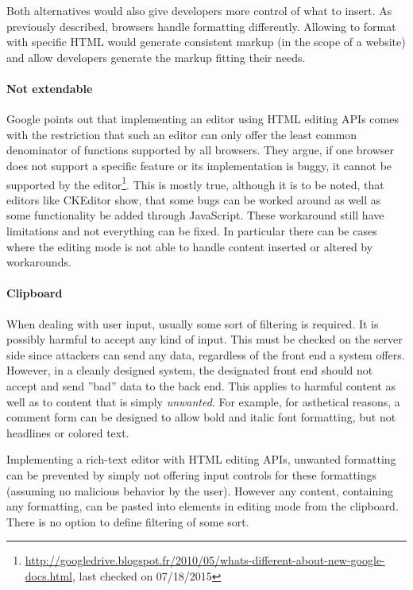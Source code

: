Both alternatives would also give developers more control of what to insert. As previously described, browsers handle formatting differently. Allowing to format with specific HTML would generate consistent markup (in the scope of a website) and allow developers generate the markup fitting their needs.


\paragraph{Not extendable}

Google points out that implementing an editor using HTML editing APIs comes with the restriction that such an editor can only offer the least common denominator of functions supported by all browsers. They argue, if one browser does not support a specific feature or its implementation is buggy, it cannot be supported by the editor\footnote{\url{http://googledrive.blogspot.fr/2010/05/whats-different-about-new-google-docs.html}, last checked on 07/18/2015}. This is mostly true, although it is to be noted, that editors like CKEditor show, that some bugs can be worked around as well as some functionality be added through JavaScript. These workaround still have limitations and not everything can be fixed. In particular there can be cases where the editing mode is not able to handle content inserted or altered by workarounds.

\paragraph{Clipboard}

When dealing with user input, usually some sort of filtering is required. It is possibly harmful to accept any kind of input. This must be checked on the server side since attackers can send any data, regardless of the front end a system offers. However, in a cleanly designed system, the designated front end should not accept and send ''bad'' data to the back end. This applies to harmful content as well as to content that is simply \textit{unwanted}. For example, for asthetical reasons, a comment form can be designed to allow bold and italic font formatting, but not headlines or colored text.

Implementing a rich-text editor with HTML editing APIs, unwanted formatting can be prevented by simply not offering input controls for these formattings (assuming no malicious behavior by the user). However any content, containing any formatting, can be pasted into elements in editing mode from the clipboard. There is no option to define filtering of some sort.

